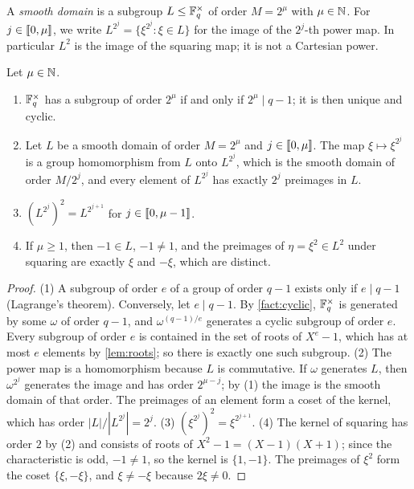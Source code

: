 \begin{definition}\label{def:domain}
A \emph{smooth domain} is a subgroup $L \le \mathbb{F}_q^{\times}$ of order $M = 2^{\mu}$ with $\mu \in \mathbb{N}$.
For $j \in \llbracket 0, \mu \rrbracket$, we write $L^{2^j} = \{\xi^{2^j} : \xi \in L\}$ for the image of the $2^j$-th power map.
In particular $L^2$ is the image of the squaring map; it is not a Cartesian power.
\end{definition}

\begin{lemma}\label{lem:power}
Let $\mu \in \mathbb{N}$.
\begin{enumerate}
  \item $\mathbb{F}_q^\times$ has a subgroup of order $2^\mu$ if and only if $2^\mu \mid q-1$; it is then unique and cyclic.
  \item Let $L$ be a smooth domain of order $M = 2^\mu$ and $j \in \llbracket 0, \mu \rrbracket$. The map $\xi \mapsto \xi^{2^j}$ is a group homomorphism from $L$ onto $L^{2^j}$, which is the smooth domain of order $M/2^j$, and every element of $L^{2^j}$ has exactly $2^j$ preimages in $L$.
  \item $(L^{2^j})^{2} = L^{2^{j+1}}$ for $j \in \llbracket 0, \mu-1 \rrbracket$.
  \item If $\mu \ge 1$, then $-1 \in L$, $-1 \ne 1$, and the preimages of $\eta = \xi^2 \in L^2$ under squaring are exactly $\xi$ and $-\xi$, which are distinct.
\end{enumerate}
\end{lemma}

\begin{proof}
(1) A subgroup of order $e$ of a group of order $q-1$ exists only if $e \mid q-1$ (Lagrange's theorem).
Conversely, let $e \mid q-1$. By \cref{fact:cyclic}, $\mathbb{F}_q^\times$ is generated by some $\omega$ of order $q-1$, and $\omega^{(q-1)/e}$ generates a cyclic subgroup of order $e$.
Every subgroup of order $e$ is contained in the set of roots of $X^e - 1$, which has at most $e$ elements by \cref{lem:roots}; so there is exactly one such subgroup.
(2) The power map is a homomorphism because $L$ is commutative. If $\omega$ generates $L$, then $\omega^{2^j}$ generates the image and has order $2^{\mu-j}$; by (1) the image is the smooth domain of that order. The preimages of an element form a coset of the kernel, which has order $|L|/|L^{2^j}| = 2^j$.
(3) $(\xi^{2^j})^2 = \xi^{2^{j+1}}$.
(4) The kernel of squaring has order $2$ by (2) and consists of roots of $X^2 - 1 = (X-1)(X+1)$; since the characteristic is odd, $-1 \ne 1$, so the kernel is $\{1,-1\}$. The preimages of $\xi^2$ form the coset $\{\xi, -\xi\}$, and $\xi \ne -\xi$ because $2\xi \ne 0$.
\end{proof}

